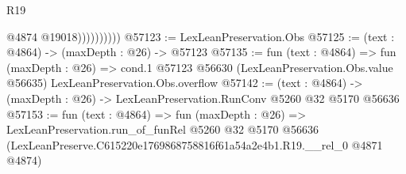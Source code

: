 \begin{lexlean}{R19}
\begin{coremodule}
                        @4874
                        @19018))))))))))
@57123 := LexLeanPreservation.Obs
@57125 := (text : @4864) -> (maxDepth : @26) -> @57123
@57135 := fun (text : @4864) =>
  fun (maxDepth : @26) =>
  cond.{1} @57123 @56630 (LexLeanPreservation.Obs.value @56635) LexLeanPreservation.Obs.overflow
@57142 := (text : @4864) -> (maxDepth : @26) -> LexLeanPreservation.RunConv @5260 @32 @5170 @56636
@57153 := fun (text : @4864) =>
  fun (maxDepth : @26) =>
  LexLeanPreservation.run_of_funRel
    @5260
    @32
    @5170
    @56636
    (LexLeanPreserve.C615220e1769868758816f61a54a2e4b1.R19.__rel_0 @4871 @4874)
\end{coremodule}
\end{lexlean}
